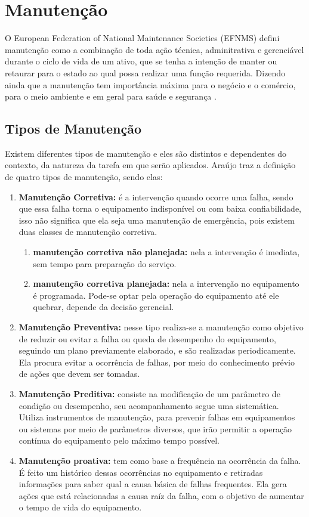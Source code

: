 \chapter{Manutenção}
\label{cap-manutencao}

O European Federation of National Maintenance Societies (EFNMS) defini manutenção como a combinação de toda ação técnica, adminitrativa e gerenciável durante o ciclo de vida de um ativo, que se tenha a intenção de manter ou retaurar para o estado ao qual possa realizar uma função requerida. Dizendo ainda que a manutenção tem importância máxima para o negócio e o comércio, para o meio ambiente e em geral para saúde e segurança \cite{efnms}.

\section{Tipos de Manutenção}

Existem diferentes tipos de manutenção e eles são distintos e dependentes do contexto, da natureza da tarefa em que serão aplicados. Araújo \cite{araujo2015} traz a definição de quatro tipos de manutenção, sendo elas:

\begin{enumerate}
	\item \textbf{Manutenção Corretiva:} é a intervenção quando ocorre uma falha, sendo que essa falha torna o equipamento indisponível ou com baixa confiabilidade, isso não significa que ela seja uma manutenção de emergência, pois existem duas classes de manutenção corretiva.
		\begin{enumerate}
			\item \textbf{manutenção corretiva não planejada:} nela a intervenção é imediata, sem tempo para preparação do serviço.
			\item \textbf{manutenção corretiva planejada:} nela a intervenção no equipamento é programada. Pode-se optar pela operação do equipamento até ele quebrar, depende da decisão gerencial.
		\end{enumerate}
	\item \textbf{Manutenção Preventiva:} nesse tipo realiza-se a manutenção como objetivo de reduzir ou evitar a falha ou queda de desempenho do equipamento, seguindo um plano previamente elaborado, e são realizadas periodicamente. Ela procura evitar a ocorrência de falhas, por meio do conhecimento prévio de ações que devem ser tomadas.
	\item \textbf{Manutenção Preditiva:} consiste na modificação de um parâmetro de condição ou desempenho, seu acompanhamento segue uma sistemática. Utiliza instrumentos de manutenção, para prevenir falhas em equipamentos ou sistemas por meio de parâmetros diversos, que irão permitir a operação contínua do equipamento pelo máximo tempo possível.
	\item \textbf{Manutenção proativa:} tem como base a frequência na ocorrência da falha. É feito um histórico dessas ocorrências no equipamento e retiradas informações para saber qual a causa básica de falhas frequentes. Ela gera ações que está relacionadas a causa raíz da falha, com o objetivo de aumentar o tempo de vida do equipamento.
\end{enumerate}

